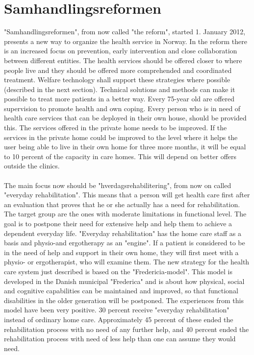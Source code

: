 \section{Samhandlingsreformen}
"Samhandlingsreformen", from now called "the reform", started 1. January 2012, presents a new way to organize the health service in Norway. In the reform there is an increased focus on prevention, early intervention and close collaboration between different entities. The health services should be offered closer to where people live and they should be offered more comprehended and coordinated treatment. Welfare technology shall support these strategies where possible (described in the next section). Technical solutions and methods can make it possible to treat more patients in a better way. Every 75-year old are offered supervision to promote health and own coping. Every person who is in need of health care services that can be deployed in their own house, should be provided this. The services offered in the private home needs to be improved. If the services in the private home could be improved to the level where it helps the user being able to live in their own home for three more months, it will be equal to 10 percent of the capacity in care homes. This will depend on better offers outside the clinics.\\ \\ The main focus now should be "hverdagsrehabilitering", from now on called  "everyday rehabilitation". This means that a person will get health care first after an evaluation that proves that he or she actually has a need for rehabilitation. The target group are the ones with moderate limitations in functional level. The goal is to postpone their need for extensive help and help them to achieve a dependent everyday life.  "Everyday rehabilitation" has the home care staff as a basis and physio-and ergotherapy as an "engine". If a patient is considered to be in the need of help and support in their own home, they will first meet with a physio- or ergotherapist, who will examine them. The new strategy for the health care system just described is based on the "Fredericia-model". This model is developed in the Danish municipal "Frederica" and is about how physical, social and cognitive capabilities can be maintained and improved, so that functional disabilities in the older generation will be postponed. The experiences from this model have been very positive. 30 percent receive "everyday rehabilitation" instead of ordinary home care. Approximately 45 percent of these ended the rehabilitation process with no need of any further help, and 40 percent ended the rehabilitation process with need of less help than one can assume they would need.\cite{budsjett}\cite{regjering}
